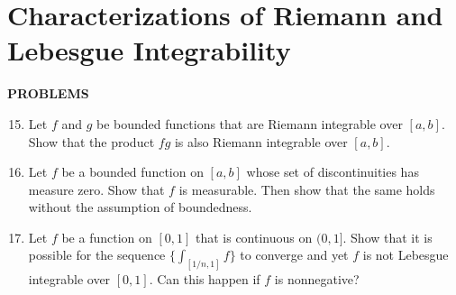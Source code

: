 \section{Characterizations of Riemann and Lebesgue Integrability}
\begin{center}
	\textbf{PROBLEMS}
\end{center}
\begin{enumerate}
	\setcounter{enumi}{14}
    \item Let $f$ and $g$ be bounded functions that are Riemann integrable over $[a,b]$. Show that the product $fg$ is also Riemann integrable over $[a,b]$.
    \item Let $f$ be a bounded function on $[a,b]$ whose set of discontinuities has measure zero. Show that $f$ is measurable. Then show that the same holds without the assumption of boundedness.
    \item Let $f$ be a function on $[0,1]$ that is continuous on $(0,1]$. Show that it is possible for the sequence $\{\int_{[1/n,1]}f\}$ to converge and yet $f$ is not Lebesgue integrable over $[0,1]$. Can this happen if $f$ is nonnegative?
\end{enumerate}